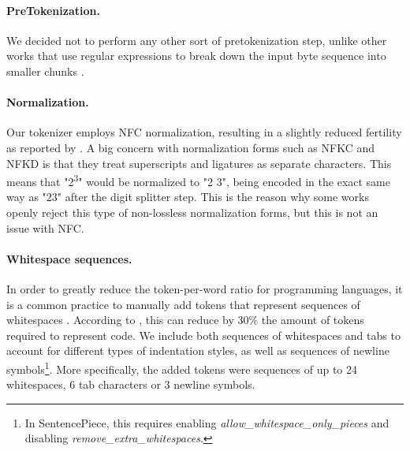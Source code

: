 \paragraph{PreTokenization.} We decided not to perform any other sort of pretokenization step, unlike other works that use regular expressions to break down the input byte sequence into smaller chunks \cite{gpt2, bloom}.

\paragraph{Normalization.} Our tokenizer employs NFC normalization, resulting in a slightly reduced fertility as reported by \citet{bloom}. A big concern with normalization forms such as NFKC and NFKD is that they treat superscripts and ligatures as separate characters. This means that "2\textsuperscript{3}" would be normalized to "2 3", being encoded in the exact same way as "23" after the digit splitter step. This is the reason why some works \cite{gopher,chinchilla} openly reject this type of non-lossless normalization forms, but this is not an issue with NFC. 

\paragraph{Whitespace sequences.} In order to greatly reduce the token-per-word ratio for programming languages, it is a common practice to manually add tokens that represent sequences of whitespaces \cite{gptneox, codegeex, erniecode}. According to \citet{codex}, this can reduce by 30\% the amount of tokens required to represent code. We include both sequences of whitespaces and tabs to account for different types of indentation styles, as well as sequences of newline symbols\footnote{In SentencePiece, this requires enabling \textit{allow\_whitespace\_only\_pieces} and disabling \mbox{\textit{remove\_extra\_whitespaces}.}}. More specifically, the added tokens were sequences of up to 24 whitespaces, 6 tab characters or 3 newline symbols. 

